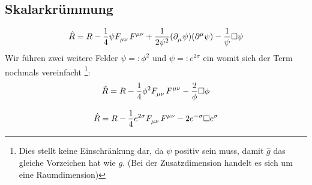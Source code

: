 \subsection{Skalarkrümmung}
\begin{equation}
\hat{R}=R-\frac{1}{4}\psi\tensor{F}{_\mu_\nu}\tensor{F}{^\mu^\nu}
+\frac{1}{2\psi^2}(\pdif{_\mu}\psi)(\pdif{^\mu}\psi)
-\frac{1}{\psi}\square\psi
\end{equation}
Wir führen zwei weitere Felder $\psi=:\phi^2$ und $\psi=:e^{2\sigma}$ ein womit
sich der Term nochmals vereinfacht \footnote{Dies stellt keine Einschränkung
dar, da $\psi$ positiv sein muss, damit $\hat{g}$ das gleiche Vorzeichen hat wie $g$. (Bei der Zusatzdimension handelt es sich um
eine Raumdimension)}:
\begin{equation}
\hat{R}=R-\frac{1}{4}\phi^2\tensor{F}{_\mu_\nu}\tensor{F}{^\mu^\nu}
-\frac{2}{\phi}\square \phi
\end{equation}

\begin{equation}
\hat{R}=R-\frac{1}{4}e^{2\sigma}\tensor{F}{_\mu_\nu}\tensor{F}{^\mu^\nu}
-2e^{-\sigma}\square e^{\sigma}
\end{equation}
